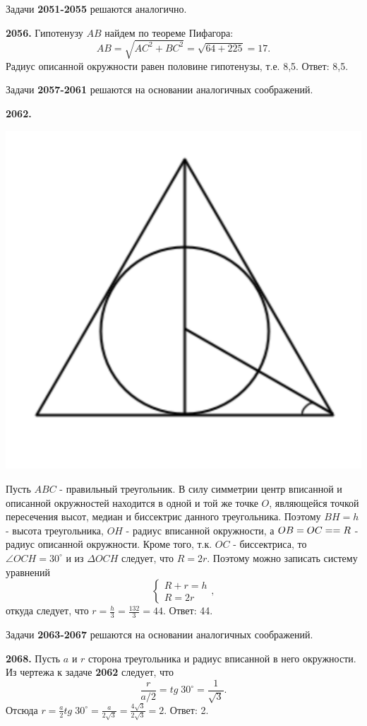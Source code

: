 Задачи \textbf{2051-2055} решаются аналогично.

\textbf{2056.} Гипотенузу $AB$ найдем по теореме Пифагора:
\[
AB = \sqrt{AC^2+BC^2} = \sqrt{64+225} = 17.
\]
Радиус описанной окружности равен половине гипотенузы, т.е. 8,5. \newline \null \hspace*{\fill} Ответ: 8,5.


Задачи \textbf{2057-2061} решаются на основании аналогичных соображений.

\textbf{2062.} 

{\centering \includegraphics[width=0.4\linewidth]{Geometry/Content/36.png}
	
}

Пусть $ABC$ - правильный треугольник. В силу симметрии центр вписанной и описанной окружностей находится в одной и той же точке $O$, являющейся точкой пересечения высот, медиан и биссектрис данного треугольника. Поэтому $BH=h$ - высота треугольника, $OH$ - радиус вписанной окружности, а $OB=OC =\linebreak= R$ - радиус описанной окружности. Кроме того, т.к. $OC$ - биссектриса, то $\angle OCH = 30^\circ$ и из $\Delta OCH$ следует, что $R = 2r$. Поэтому можно записать систему уравнений
\[
\begin{cases}
	R + r = h \\
	R = 2r
\end{cases},
\]
откуда следует, что $r = \frac{h}{3} = \frac{132}{3} = 44.$ \newline \null \hspace*{\fill} Ответ: 44.

Задачи \textbf{2063-2067}  решаются на основании аналогичных соображений.

\textbf{2068.} Пусть $a$ и $r$ сторона треугольника и радиус вписанной в него окружности.  Из чертежа к задаче \textbf{2062} следует, что 
\[
\frac{r}{a/2}  =tg\;30^\circ = \frac{1}{\sqrt{3}}.
\]  
Отсюда $r = \frac{a}{2} tg \; 30^\circ = \frac{a}{2\sqrt{3}} = \frac{4\sqrt{3}}{2\sqrt{3}} = 2.$ \newline \null \hspace*{\fill} Ответ: 2.

